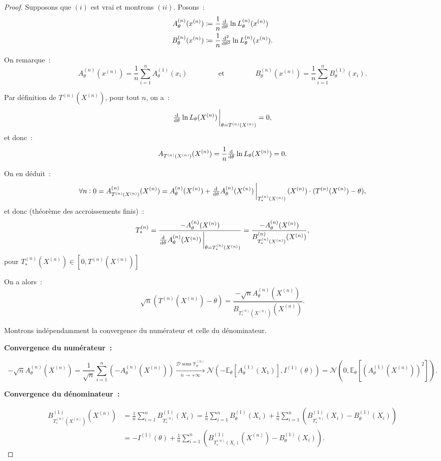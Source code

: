 \documentclass{report}
\renewcommand{\P}{\mathbb P}
\newcommand{\E}{\mathbb E}
\newcommand{\pinfty}{{+\infty}}
\newcommand{\n}{{(n)}}
\newcommand{\Xn}{{X^\n}}
\newcommand{\Tn}{{T^\n}}
\newcommand{\TnXn}{{\Tn(\Xn)}}
\theoremstyle{definition}
\theoremstyle{remark}
\begin{document}
			\begin{proof} Supposons que $(i)$ est vrai et montrons $(ii)$. Posons~:
			\begin{align*}
				A^\n_\theta(x^\n) &\coloneqq \frac 1n \od {}\theta \ln L_\theta^\n(x^\n) \\
				B^\n_\theta(x^\n) &\coloneqq \frac 1n \od[2] {}\theta \ln L_\theta^\n(x^\n).
			\end{align*}

			On remarque~:
			\[A^\n_\theta(x^\n) = \frac 1n\sum_{i=1}^nA^{(1)}_\theta(x_i) \qquad\qquad\text{ et }\qquad\qquad B^\n_\theta(x^\n)
				= \frac 1n\sum_{i=1}^nB^{(1)}_\theta(x_i).\]

			Par définition de $\TnXn$, pour tout $n$, on a~:
			\[\od {}\theta \ln L_\theta(\Xn)\sVert[3]_{\theta = \TnXn} = 0,\]
			et donc~:
			\[A_{\TnXn}(\Xn) = \frac 1n\od {}\theta\ln L_\theta(\Xn) = 0.\]

			On en déduit~:
			\[\forall n : 0 = A_{\TnXn}^{(n)}(\Xn) = A_\theta^{(n)}(\Xn) + \od {}\theta A_\theta^{(n)}(\Xn)\sVert[3]_{T_*^{(n)}(\Xn)}(\Xn) \cdot (\TnXn - \theta),\]
			et donc (théorème des accroissements finis)~:
			\[T_*^{(n)} = \frac {-A_\theta^{(n)}(\Xn)}{\od {}\theta A_\theta^{(n)}(\Xn)\sVert[3]_{\theta=T_*^{(n)}(\Xn)}}
				= \frac {-A_\theta^{(n)}(\Xn)}{B_{T_*^{(n)}(\Xn)}^{(n)}(\Xn)},\]
			pour $T_*^{(n)}(\Xn) \in [0, \TnXn]$

			On a alors~:
			\[\sqrt n\left(\TnXn - \theta\right) = \frac {-\sqrt nA_\theta^{(n)}(\Xn)}{B_{T_*^{(n)}(\Xn)}(\Xn)}.\]

			Montrons indépendamment la convergence du numérateur et celle du dénominateur.

			\textbf{Convergence du numérateur~:}

			\[-\sqrt nA_\theta^{(n)}(\Xn) = \frac 1{\sqrt n}\sum_{i=1}^n\left(-A_\theta^{(n)}(\Xn)\right)
				\xrightarrow[n \to \pinfty]{\mathcal D\text{ sous } \P_\theta^{(n)}} \mathcal N(-\E_\theta[A_\theta^{(1)}(X_1)], I^{(1)}(\theta))
				= \mathcal N(0, \E_\theta[(A_\theta^{(1)}(\Xn))^2]).\]

			\textbf{Convergence du dénominateur~:}

			\begin{align*}
				B_{T_*^{(n)}(\Xn)}^{(1)}(\Xn) &= \frac 1n\sum_{i=1}^nB_{T_*^{(n)}}^{(1)}(X_i)
					= \frac 1n\sum_{i=1}^nB_\theta^{(1)}(X_i) + \frac 1n\sum_{i=1}^n\left(B_{T_*^{(n)}}^{(1)}(X_i) - B_\theta^{(1)}(X_i)\right) \\
				&= -I^{(1)}(\theta) + \frac 1n\sum_{i=1}^n\left(B_{T_*^{(n)}(X_i)}^{(1)}(\Xn) - B_\theta^{(1)}(X_i)\right).
			\end{align*}


\end{proof}
\end{document}
